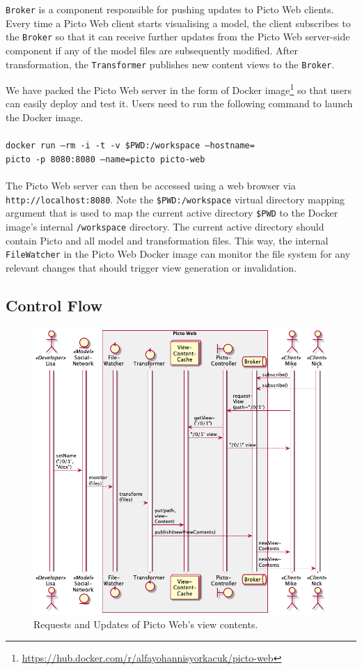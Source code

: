 \documentclass[sigconf,review]{acmart}
\begin{document}
\texttt{Broker} is a component responsible for pushing updates to Picto Web clients. Every time a Picto Web client starts visualising a model, the client subscribes to the \texttt{Broker} so that it can receive further updates from the Picto Web server-side component if any of the model files are subsequently modified. After transformation, the \texttt{Transformer} publishes new content views to the \texttt{Broker}.

We have packed the Picto Web server in the form of Docker image\footnote{\url{https://hub.docker.com/r/alfayohannisyorkacuk/picto-web}} so that users can easily deploy and test it. Users need to run the following command to launch the Docker image.\\\\ 
%
\texttt{docker run --rm -i -t -v \$PWD:/workspace --hostname=\\picto -p 8080:8080 --name=picto picto-web}\\\\
%
The Picto Web server can then be accessed using a web browser via \texttt{http://localhost:8080}. Note the \texttt{\$PWD:/workspace} virtual directory mapping argument that is used to map the current active directory \texttt{\$PWD} to  the Docker image's internal \texttt{/workspace} directory. The current active directory should contain Picto and all model and transformation files. This way, the internal \texttt{FileWatcher} in the Picto Web Docker image can monitor the file system for any relevant changes that should trigger view generation or invalidation.

\subsection{Control Flow}

\begin{figure}[h]
  \centering
  \includegraphics[width=0.89\linewidth]{images/sequence.png}
  \caption{Requests and Updates of Picto Web's view contents.}
  \label{fig:sequence}
\end{figure}
\end{document}
